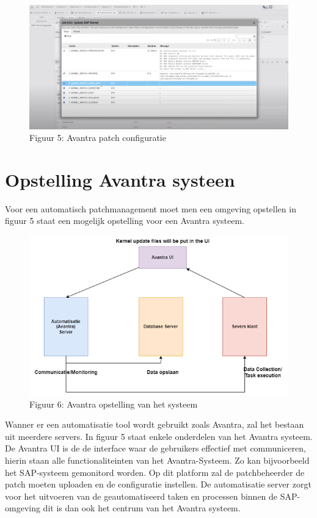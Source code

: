\documentclass[dutch,dit,thesis]{hogentreport}
\begin{document}
\begin{figure}[htbp]
    \centering
    \includegraphics[width=\textwidth]{avantra3.png}
    \caption{Figuur 5: Avantra patch configuratie}
     \label{fig:avantra1}
\end{figure}


\section{Opstelling Avantra systeen}
Voor een automatisch patchmanagement moet men een omgeving opstellen in figuur 5 staat een mogelijk opstelling voor een Avantra systeem. 
\begin{figure}[htbp]
    \centering
    \includegraphics[width=\textwidth]{avantra4.png}
    \caption{Figuur 6: Avantra opstelling van het systeem}
     \label{fig:avantra1}
\end{figure}

Wanner er een automatisatie tool wordt gebruikt zoals Avantra, zal het bestaan uit meerdere servers. In figuur 5 staat enkele onderdelen van het Avantra systeem. De Avantra UI is de de interface waar de gebruikers effectief met communiceren, hierin staan alle functionaliteinten van het Avantra-Systeem. Zo kan bijvoorbeeld het SAP-systeem gemonitord worden. Op
dit platform zal de patchbeheerder de patch moeten uploaden en de configuratie instellen. De automatisatie server zorgt voor het uitvoeren van de geautomatiseerd taken en processen binnen de SAP-omgeving dit is dan ook het centrum van het Avantra systeem.
\end{document}
